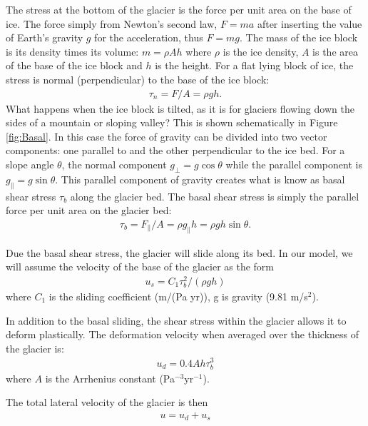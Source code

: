 \documentclass[11pt, oneside]{article}   	%
\begin{document}
The stress at the bottom of the glacier is the force per unit area on the base of ice.   The force simply from Newton's second law, $F= m a$ after inserting the value of Earth's gravity $g$ for the acceleration, thus $F=mg$. The mass of the ice block is its density times its volume: $m = \rho A h$ where $\rho$ is the ice density, $A$ is the area of the base of the ice block and $h$ is the height.  For a flat lying block of ice, the stress is normal (perpendicular) to the base of the ice block:
\begin{eqnarray}
	\tau_n = F/A =\rho g h.
\end{eqnarray}
What happens when the ice block is tilted, as it is for glaciers flowing down the sides of a mountain or sloping valley? This is shown schematically in Figure \ref{fig:Basal}. In this case the force of gravity can be divided into two vector components: one parallel to and the other perpendicular  to the ice bed.    For a slope angle $\theta$, the normal component $g_\perp = g \cos \theta$ while the parallel component is $g_\parallel = g \sin \theta$.   This parallel component of gravity  creates what is know as basal shear stress $\tau_b$ along the glacier bed. The basal shear stress is simply the parallel force per unit area on the glacier bed:
\begin{eqnarray}
	\tau_b = F_\parallel/A =\rho g_\parallel h = \rho g h \sin \theta.
\end{eqnarray}

Due the basal shear stress, the glacier will slide along its bed. In our model, we will assume the velocity of the base of the glacier as the form
\begin{eqnarray}
	u_s = C_1  \tau_b^2 / (\rho g h) 
\end{eqnarray}
where $C_1$ is the sliding coefficient (m/(Pa yr)), g is gravity (9.81 m/s$^2$). 

In addition to the basal sliding, the shear stress within the glacier allows it to deform plastically.  The deformation velocity when averaged over the thickness of the glacier is:
\begin{eqnarray}
	u_d = 0.4  A h \tau_b^3
\end{eqnarray}
where $ A$ is the Arrhenius constant (Pa$^{-3}$yr$^{-1}$).  

The total lateral velocity of the glacier is then
\begin{eqnarray}
	u = u_d + u_s
\end{eqnarray}


\end{document}
